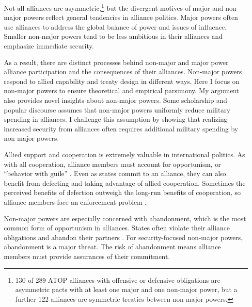 \documentclass[12pt]{article}
\begin{document}
Not all alliances are asymmetric,\footnote{130 of 289 ATOP alliances with offensive or defensive obligations are asymmetric pacts with at least one major and one non-major power, but a further 122 alliances are symmetric treaties between non-major powers.} but the divergent motives of major and non-major powers reflect general tendencies in alliance politics. 
Major powers often use alliances to address the global balance of power and issues of influence. 
Smaller non-major powers tend to be less ambitious in their alliances and emphasize immediate security. 


As a result, there are distinct processes behind non-major and major power alliance participation and the consequences of their alliances. 
Non-major powers respond to allied capability and treaty design in different ways. 
Here I focus on non-major powers to ensure theoretical and empirical parsimony.
My argument also provides novel insights about non-major powers.  
Some scholarship and popular discourse assumes that non-major powers uniformly reduce military spending in alliances.
I challenge this assumption by showing that realizing increased security from alliances often requires additional military spending by non-major powers. 


Allied support and cooperation is extremely valuable in international politics. 
As with all cooperation, alliance members must account for opportunism, or ``behavior with guile'' \citep{Williamson1985}. 
Even as states commit to an alliance, they can also benefit from defecting and taking advantage of allied cooperation. 
Sometimes the perceived benefits of defection outweigh the long-run benefits of cooperation, so alliance members face an enforcement problem \citep{Fearon1998a, Koremenosetal2001}.


Non-major powers are especially concerned with abandonment, which is the most common form of opportunism in alliances.
States often violate their alliance obligations and abandon their partners \citep{BerkemeierFuhrmann2018}.
For security-focused non-major powers, abandonment is a major threat. 
The risk of abandonment means alliance members must provide assurances of their commitment. 
\end{document}
